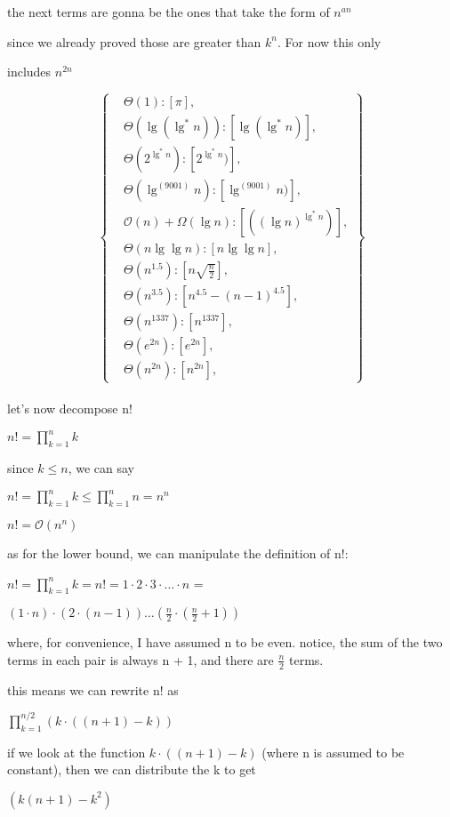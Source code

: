 \documentclass[11pt,fleqn]{article}
\theoremstyle{definition}
\theoremstyle{remark}
\begin{document}
the next terms are gonna be the ones that take the form of $n^{an}$

since we already proved those are greater than $k^n$. For now this only 

includes $n^{2n}$

\[
\left\{
\begin{aligned}
& \Theta(1): [\pi],\\
& \Theta(\lg(\lg^*n)): [\lg(\lg^*n)],\\
& \Theta(2^{\lg^*n}): [2^{\lg^*n})],\\
& \Theta(\lg^{(9001)} n): [\lg^{(9001)} n)],\\
& \mathcal{O}(n)+\Omega(\lg n): [({(\lg n)}^{\lg^*{n}})],\\
& \Theta(n\lg \lg n): [n\lg \lg n],\\
& \Theta(n^{1.5}): [n\sqrt{\frac{n}{2}}],\\
& \Theta(n^{3.5}): [n^{4.5} - (n - 1)^{4.5}],\\ 
& \Theta(n^{1337}): [n^{1337}],\\
& \Theta(e^{2n}): [e^{2n}],\\
& \Theta(n^{2n}): [n^{2n}],
\end{aligned}
\right\}
\]\\

let's now decompose n!

$n! = \prod_{k=1}^{n} k$

since $k\leq n$, we can say

$n! = \prod_{k=1}^{n} k \leq  \prod_{k=1}^{n} n = n^n$

$n! = \mathcal{O}(n^n)$

as for the lower bound, we can manipulate the definition of n!:

$n! = \prod_{k=1}^{n} k = n! = 1 \cdot 2 \cdot 3 \cdot \dots \cdot n$ = 

$(1 \cdot n) \cdot (2 \cdot (n-1))  \dots (\frac{n}{2} \cdot (\frac{n}{2} + 1))$

where, for convenience, I have assumed n to be even.
notice, the sum of the two terms in each pair is always n + 1,
and there are $\frac{n}{2}$ terms.

this means we can rewrite n! as 

$\prod_{k=1}^{n/2} (k \cdot ((n + 1) - k))$

if we look at the function $k \cdot ((n + 1) - k)$ (where n is assumed to be 
constant), then we can distribute the k to get 

$(k(n + 1) - k^2)$
\end{document}
